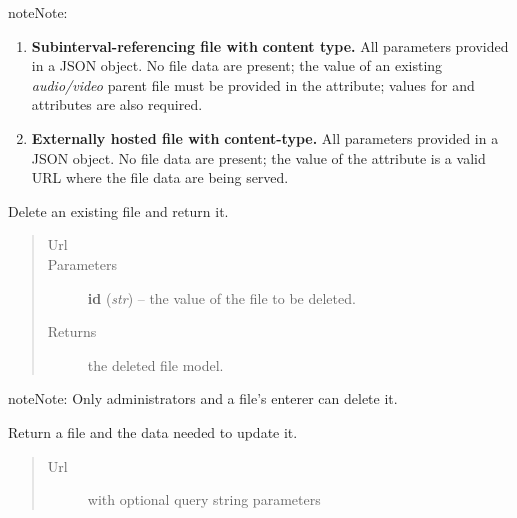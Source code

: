 \documentclass[letterpaper,10pt,english]{sphinxmanual}
\begin{document}
\begin{fulllineitems}
\begin{fulllineitems}
\begin{notice}{note}{Note:}
\begin{enumerate}
\item {} 
\textbf{Subinterval-referencing file with}  \textbf{content type.}
All parameters provided in a JSON object.  No file data are
present; the  value of an existing \emph{audio/video} parent
file must be provided in the  attribute; values for
 and  attributes are also required.

\item {} 
\textbf{Externally hosted file with}  \textbf{content-type.}
All parameters provided in a JSON object.  No file data are
present; the value of the  attribute is a valid URL where
the file data are being served.

\end{enumerate}
\end{notice}

\end{fulllineitems}


\begin{fulllineitems}
\label{api:onlinelinguisticdatabase.controllers.files.FilesController.delete}
Delete an existing file and return it.
\begin{quote}\begin{description}
\item[{Url }] \leavevmode
{}

\item[{Parameters}] \leavevmode
\textbf{id} (\emph{str}) -- the  value of the file to be deleted.

\item[{Returns}] \leavevmode
the deleted file model.

\end{description}\end{quote}

\begin{notice}{note}{Note:}
Only administrators and a file's enterer can delete it.
\end{notice}

\end{fulllineitems}


\begin{fulllineitems}
\label{api:onlinelinguisticdatabase.controllers.files.FilesController.edit}
Return a file and the data needed to update it.
\begin{quote}\begin{description}
\item[{Url }] \leavevmode
{} with optional query string parameters


\end{description}
\end{quote}
\end{fulllineitems}
\end{fulllineitems}
\end{document}
